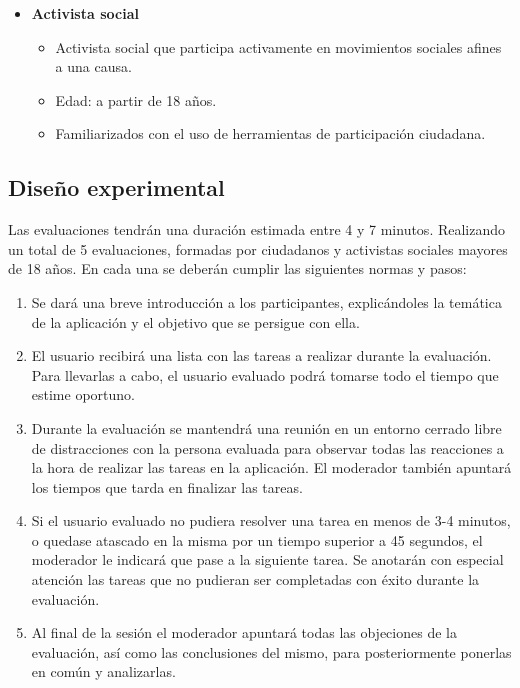 \begin{itemize}
 \item \textbf{Activista social}
 \begin{itemize}
  \item Activista social que participa activamente en movimientos sociales afines a una causa.
  \item Edad: a partir de 18 años.
  \item Familiarizados con el uso de herramientas de participación ciudadana.
 \end{itemize}
\end{itemize}

\subsection{Diseño experimental}

Las evaluaciones tendrán una duración estimada entre 4 y 7 minutos. Realizando un total de 5 evaluaciones, formadas por ciudadanos y activistas sociales mayores de 18 años. En cada una se deberán cumplir las siguientes normas y pasos:

\begin{enumerate}
 \item Se dará una breve introducción a los participantes, explicándoles  la temática de la aplicación y el objetivo que se persigue con ella.
 \item El usuario recibirá una lista con las tareas a realizar durante la evaluación. Para llevarlas a cabo, el usuario evaluado podrá tomarse todo el tiempo que estime oportuno.
 \item Durante la evaluación se mantendrá una reunión en un entorno cerrado libre de distracciones con la persona evaluada para observar todas las reacciones a la hora de realizar las tareas en la aplicación. El moderador también apuntará los tiempos que tarda en finalizar las tareas.
 \item Si el usuario evaluado no pudiera resolver una tarea en menos de 3-4 minutos, o quedase atascado en la misma por un tiempo superior a 45 segundos, el moderador le indicará que pase a la siguiente tarea. Se anotarán con especial atención las tareas que no pudieran ser completadas con éxito durante la evaluación.
 \item Al final de la sesión el moderador apuntará todas las objeciones de la evaluación, así como las conclusiones del mismo, para posteriormente ponerlas en común y analizarlas.
 \end{enumerate}

